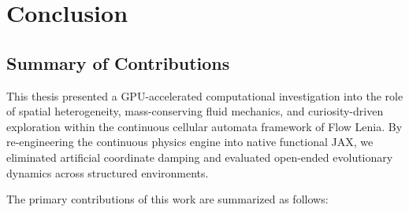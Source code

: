 \section{Conclusion}
\label{sec:conclusion}

\subsection{Summary of Contributions}
\label{subsec:concl_summary}

This thesis presented a GPU-accelerated computational investigation into the role of spatial heterogeneity, mass-conserving fluid mechanics, and curiosity-driven exploration within the continuous cellular automata framework of Flow Lenia. By re-engineering the continuous physics engine into native functional JAX, we eliminated artificial coordinate damping and evaluated open-ended evolutionary dynamics across structured environments.

The primary contributions of this work are summarized as follows:

